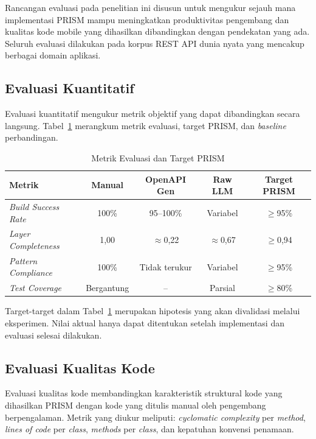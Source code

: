 Rancangan evaluasi pada penelitian ini disusun untuk mengukur sejauh mana implementasi PRISM mampu meningkatkan produktivitas pengembang dan kualitas kode mobile yang dihasilkan dibandingkan dengan pendekatan yang ada. Seluruh evaluasi dilakukan pada korpus REST API dunia nyata yang mencakup berbagai domain aplikasi.

\subsection{Evaluasi Kuantitatif}

Evaluasi kuantitatif mengukur metrik objektif yang dapat dibandingkan secara langsung. Tabel~\ref{tab:metrik} merangkum metrik evaluasi, target PRISM, dan \textit{baseline} perbandingan.

\begin{table}[H]
\caption{Metrik Evaluasi dan Target PRISM}
\label{tab:metrik}
\fontsize{10pt}{12pt}\selectfont
\begin{tabular}{p{2.8cm}cccc}
\toprule
\textbf{Metrik} & \textbf{Manual} & \textbf{OpenAPI Gen} & \textbf{Raw LLM} & \textbf{Target PRISM} \\
\midrule
\textit{Build Success Rate} & 100\% & 95--100\% & Variabel & $\geq$95\% \\
\textit{Layer Completeness} & 1,00 & $\approx$0,22 & $\approx$0,67 & $\geq$0,94 \\
\textit{Pattern Compliance} & 100\% & Tidak terukur & Variabel & $\geq$95\% \\
\textit{Test Coverage} & Bergantung & -- & Parsial & $\geq$80\% \\
\bottomrule
\end{tabular}
\end{table}

Target-target dalam Tabel~\ref{tab:metrik} merupakan hipotesis yang akan divalidasi melalui eksperimen. Nilai aktual hanya dapat ditentukan setelah implementasi dan evaluasi selesai dilakukan.

\subsection{Evaluasi Kualitas Kode}

Evaluasi kualitas kode membandingkan karakteristik struktural kode yang dihasilkan PRISM dengan kode yang ditulis manual oleh pengembang berpengalaman. Metrik yang diukur meliputi: \textit{cyclomatic complexity} per \textit{method}, \textit{lines of code} per \textit{class}, \textit{methods} per \textit{class}, dan kepatuhan konvensi penamaan.

